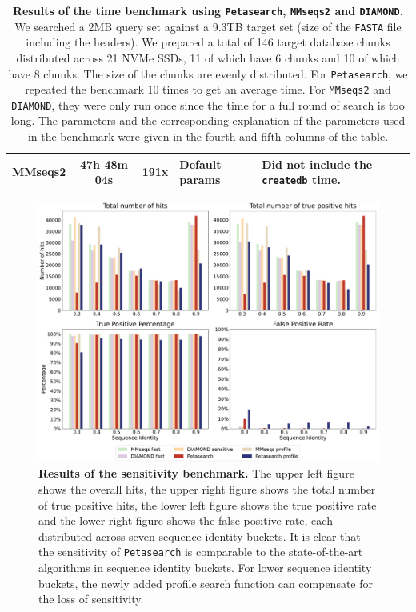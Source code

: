 \begin{figpage}
\begin{table}[]
\begin{tabular}{|c|c|c|l|l|}
      \rowcolor[HTML]{FFFFFF}
      MMseqs2                                                                                & 47h 48m 04s & 191x & Default params                   & Did not include the \texttt{createdb} time. \\ \hline
    \end{tabular}
    \caption{\textbf{Results of the time benchmark using \texttt{Petasearch}, \texttt{MMseqs2} and \texttt{DIAMOND}.}
      We searched a 2MB query set against a 9.3TB target set (size of the \texttt{FASTA} file including the headers). We prepared a total of 146 target database chunks distributed across 21 NVMe SSDs, 11 of which have 6 chunks and 10 of which have 8 chunks.
      The size of the chunks are evenly distributed. For \texttt{Petasearch}, we repeated the benchmark 10 times to get an average time.
      For \texttt{MMseqs2} and \texttt{DIAMOND}, they were only run once since the time for a full round of search is too long. The parameters and the corresponding explanation of the parameters used in the benchmark were given in the fourth and fifth columns of the table.}
    \label{tab:time_benchmark}
  \end{table}
  \restoregeometry
\end{figpage}
\pagebreak

\begin{figpage}
  \captionsetup[figure]{width=.8\linewidth}
  \begin{figure}
    \centering
    \includegraphics[width=\textwidth]{images/everything.pdf}
    \caption{\textbf{Results of the sensitivity benchmark.} The upper left figure shows the overall hits, the upper right figure shows the total number of true positive hits, the lower left figure shows the true positive rate and the lower right figure shows the false positive rate, each distributed across seven sequence identity buckets. It is clear that the sensitivity of \texttt{Petasearch} is comparable to the state-of-the-art algorithms in sequence identity buckets. For lower sequence identity buckets, the newly added profile search function can compensate for the loss of sensitivity.}
    \label{fig:sensitivity}
  \end{figure}
  \restoregeometry
\end{figpage}
\pagebreak
